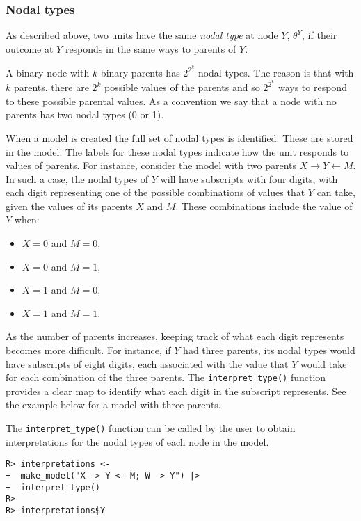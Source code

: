 \documentclass[
  11pt,
  article]{jss}
\providecommand{\tightlist}{%
  \setlength{\itemsep}{0pt}\setlength{\parskip}{0pt}}\usepackage{longtable,booktabs,array}
\begin{document}
\hypertarget{sec-nodal-types}{%
\subsubsection{Nodal types}\label{sec-nodal-types}}

As described above, two units have the same \emph{nodal type} at node
\(Y\), \(\theta^Y\), if their outcome at \(Y\) responds in the same ways
to parents of \(Y\).

A binary node with \(k\) binary parents has \(2^{2^k}\) nodal types. The
reason is that with \(k\) parents, there are \(2^k\) possible values of
the parents and so \(2^{2^k}\) ways to respond to these possible
parental values. As a convention we say that a node with no parents has
two nodal types (0 or 1).

When a model is created the full set of nodal types is identified. These
are stored in the model. The labels for these nodal types indicate how
the unit responds to values of parents. For instance, consider the model
with two parents \(X \rightarrow Y \leftarrow M.\) In such a case, the
nodal types of \(Y\) will have subscripts with four digits, with each
digit representing one of the possible combinations of values that \(Y\)
can take, given the values of its parents \(X\) and \(M.\) These
combinations include the value of \(Y\) when:

\begin{itemize}
\tightlist
\item
  \(X = 0\) and \(M = 0\),
\item
  \(X = 0\) and \(M = 1\),
\item
  \(X = 1\) and \(M = 0\),
\item
  \(X = 1\) and \(M = 1\).
\end{itemize}

As the number of parents increases, keeping track of what each digit
represents becomes more difficult. For instance, if \(Y\) had three
parents, its nodal types would have subscripts of eight digits, each
associated with the value that \(Y\) would take for each combination of
the three parents. The \texttt{interpret\_type()} function provides a
clear map to identify what each digit in the subscript represents. See
the example below for a model with three parents.

The \texttt{interpret\_type()} function can be called by the user to
obtain interpretations for the nodal types of each node in the model.

\begin{verbatim}
R> interpretations <- 
+  make_model("X -> Y <- M; W -> Y") |> 
+  interpret_type()
R> 
R> interpretations$Y
\end{verbatim}
\end{document}
